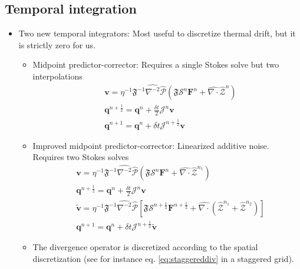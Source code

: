 \documentclass[ twoside,openright,titlepage,numbers=noenddot,%
headinclude,footinclude,cleardoublepage=empty,abstract=on,
BCOR=5mm,paper=a4,fontsize=11pt, dvipsnames
]{scrreprt}
\renewcommand{\vec}[1]{\bm{#1}}
\newcommand{\oper}[1]{\mathcal{#1}}
\newcommand{\dt}{\delta t}
\newcommand{\half}{\frac{1}{2}}
\newcommand{\fou}[1]{\widehat{#1}}
\newcommand{\ppos}{q}
\newcommand{\fvel}{v}
\begin{document}
\subsection*{Temporal integration}
\begin{itemize}
\item Two new temporal integrators: Most useful to discretize thermal drift, but it is strictly zero for us. 
  \begin{itemize}
  \item Midpoint predictor-corrector: Requires a single Stokes solve but two interpolations
    \begin{equation}
      \begin{aligned}
        &\vec{\fvel} = \eta^{-1}\mathfrak{F}^{-1}\fou{\nabla^{-2}}\fou{\oper{P}}(\mathfrak{F}\oper{S}^{n}\vec{F}^{n} + \fou{\nabla\cdot}\fou{\mathcal{Z}}^{n})\\
        &\vec{\ppos}^{n+\half} = \vec{\ppos}^n + \frac{\dt}{2}\oper{J}^n\vec{\fvel}\\
        &\vec{\ppos}^{n+1} = \vec{\ppos}^n + \dt\oper{J}^{n+\half}\vec{\fvel}
      \end{aligned}
    \end{equation}

  \item Improved midpoint predictor-corrector: Linearized additive noise. Requires two Stokes solves
    \begin{equation}
      \begin{aligned}
        &\vec{\fvel} = \eta^{-1}\mathfrak{F}^{-1}\fou{\nabla^{-2}}\fou{\oper{P}}(\mathfrak{F}\oper{S}^{n}\vec{F}^{n} + \fou{\nabla\cdot}\fou{\mathcal{Z}}^{n_1})\\
        &\vec{\ppos}^{n+\half} = \vec{\ppos}^n + \frac{\dt}{2}\oper{J}^n\vec{\fvel}\\
        &\tilde{\vec{\fvel}}= \eta^{-1}\mathfrak{F}^{-1}\fou{\nabla^{-2}}\fou{\oper{P}}\left[\mathfrak{F}\oper{S}^{n+\half}\vec{F}^{n+\half} + \fou{\nabla\cdot}\left(\fou{\mathcal{Z}}^{n_1} +  \fou{\mathcal{Z}}^{n_2}\right)\right]\\
        &\vec{\ppos}^{n+1}= \vec{\ppos}^n + \dt\oper{J}^{n+\half}\tilde{\vec{\fvel}}
      \end{aligned}      
    \end{equation}
    \item The divergence operator is discretized according to the spatial discretization (see for instance eq. \eqref{eq:staggereddiv} in a staggered grid).
  \end{itemize}
  
\end{itemize}
\end{document}
